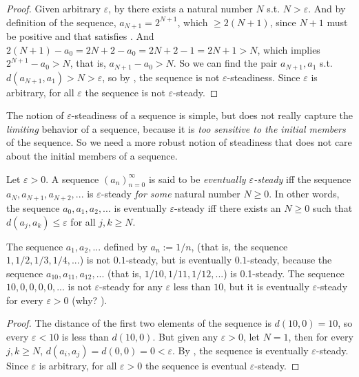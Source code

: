 \begin{proof}
 Given arbitrary \(\varepsilon\), by  there exists a natural number \(N\) s.t. \(N > \varepsilon\).
And by definition of the sequence, \(a_{N + 1} = 2^{N + 1}\), which \(\ge 2(N + 1)\), since \(N + 1\) must be positive and that satisfies .
And \(2(N + 1) - a_0 = 2N + 2 - a_0 = 2N + 2 - 1 = 2N + 1 > N\), which implies \(2^{N + 1} - a_0 > N\), that is, \(a_{N + 1} - a_0 > N\).
So we can find the pair \(a_{N + 1}, a_1\) s.t. \(d(a_{N + 1}, a_1) > N > \varepsilon\), so by , the sequence is not \(\varepsilon\)-steadiness.
Since \(\varepsilon\) is arbitrary, for all \(\varepsilon\) the sequence is not \(\varepsilon\)-steady.
\end{proof}

\begin{note}
The notion of \(\varepsilon\)-steadiness of a sequence is simple, but does not really capture the \emph{limiting} behavior of a sequence, because it is \emph{too sensitive to the initial members} of the sequence.
So we need a more robust notion of steadiness that does not care about the initial members of a sequence.
\end{note}

\begin{definition}  \label{def 5.1.6}
Let \(\varepsilon > 0\).
A sequence \((a_n)_{n = 0}^{\infty}\) is said to be \emph{eventually \(\varepsilon\)-steady} iff the sequence \(a_N, a_{N + 1}, a_{N + 2},...\) is \(\varepsilon\)-steady \emph{for some} natural number \(N \ge 0\).
In other words, the sequence \(a_0, a_1, a_2, ...\) is eventually \(\varepsilon\)-steady iff there exists an \(N \ge 0\) such that \(d(a_j, a_k) \le \varepsilon\) for all \(j, k \ge N\).
\end{definition}

\begin{example} \label{example 5.1.7}
\raggedright The sequence \(a_1, a_2, ...\) defined by \(a_n := 1/n\), (that is, the sequence \(1, 1/2, 1/3, 1/4,...\)) is not \(0.1\)-steady, but is eventually \(0.1\)-steady, because the sequence \(a_{10}, a_{11}, a_{12}, ...\) (that is, \(1/10, 1/11, 1/12,...\)) is 0.1-steady.
The sequence \(10, 0, 0, 0, 0, ...\) is not \(\varepsilon\)-steady for any \(\varepsilon\) less than \(10\), but it is eventually \(\varepsilon\)-steady for every \(\varepsilon > 0\) (why? ).
\end{example}

\begin{proof}
 The distance of the first two elements of the sequence is \(d(10, 0) = 10\), so every \(\varepsilon < 10\) is less than \(d(10, 0)\).
But given any \(\varepsilon > 0\), let \(N = 1\), then for every \(j, k \ge N\), \(d(a_i, a_j) = d(0, 0) = 0 < \varepsilon\).
By , the sequence is eventually \(\varepsilon\)-steady.
Since \(\varepsilon\) is arbitrary, for all \(\varepsilon > 0\) the sequence is eventual \(\varepsilon\)-steady.
\end{proof}


